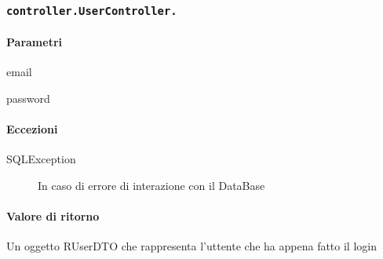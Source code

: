 \subsubsection{\texttt{controller.UserController.}}

\paragraph{Parametri}
\begin{description}
\item email
\item password
\end{description}
\paragraph{Eccezioni}
\begin{description}
\item[SQLException] In caso di errore di interazione con il DataBase
\end{description}
\paragraph{Valore di ritorno}
Un oggetto RUserDTO che rappresenta l'uttente che ha appena fatto il login

